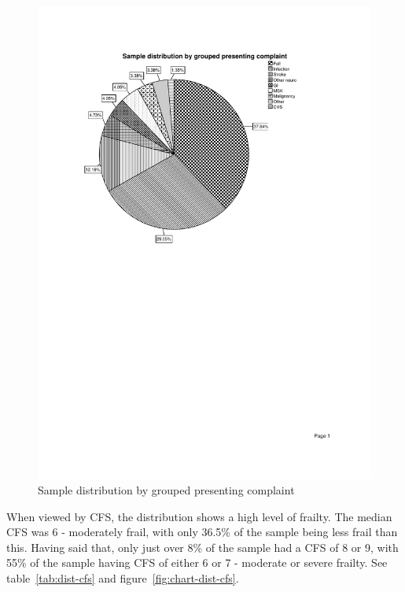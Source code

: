 \documentclass
[
	12pt,
	a4paper,
	oneside,
]{report}
\begin{document}
\begin{figure}[ht]
\caption{Sample distribution by grouped presenting complaint}
\label{fig:pres-comp}
\includegraphics[width=\textwidth,
	trim={2.5cm 14cm 2.5cm 2.5cm},
	clip]{media/chart-pres-comp}
\end{figure}

When viewed by CFS, the distribution shows a high level of frailty. The median 
CFS was 6 - moderately frail, with only 36.5\% of the sample being less frail
than this. Having said that, only just over 8\% of the sample had a CFS of 8
or 9, with 55\% of the sample having CFS of either 6 or 7 - moderate or
severe frailty. See table~\ref{tab:dist-cfs} and 
figure~\ref{fig:chart-dist-cfs}.
\end{document}
